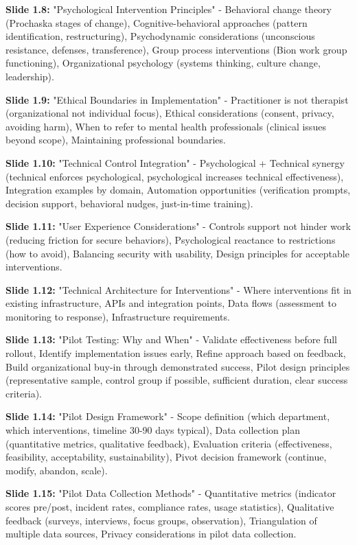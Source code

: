 \documentclass[11pt,a4paper]{article}
\begin{document}
\textbf{Slide 1.8:} "Psychological Intervention Principles" - Behavioral change theory (Prochaska stages of change), Cognitive-behavioral approaches (pattern identification, restructuring), Psychodynamic considerations (unconscious resistance, defenses, transference), Group process interventions (Bion work group functioning), Organizational psychology (systems thinking, culture change, leadership).

\textbf{Slide 1.9:} "Ethical Boundaries in Implementation" - Practitioner is not therapist (organizational not individual focus), Ethical considerations (consent, privacy, avoiding harm), When to refer to mental health professionals (clinical issues beyond scope), Maintaining professional boundaries.

\textbf{Slide 1.10:} "Technical Control Integration" - Psychological + Technical synergy (technical enforces psychological, psychological increases technical effectiveness), Integration examples by domain, Automation opportunities (verification prompts, decision support, behavioral nudges, just-in-time training).

\textbf{Slide 1.11:} "User Experience Considerations" - Controls support not hinder work (reducing friction for secure behaviors), Psychological reactance to restrictions (how to avoid), Balancing security with usability, Design principles for acceptable interventions.

\textbf{Slide 1.12:} "Technical Architecture for Interventions" - Where interventions fit in existing infrastructure, APIs and integration points, Data flows (assessment to monitoring to response), Infrastructure requirements.

\textbf{Slide 1.13:} "Pilot Testing: Why and When" - Validate effectiveness before full rollout, Identify implementation issues early, Refine approach based on feedback, Build organizational buy-in through demonstrated success, Pilot design principles (representative sample, control group if possible, sufficient duration, clear success criteria).

\textbf{Slide 1.14:} "Pilot Design Framework" - Scope definition (which department, which interventions, timeline 30-90 days typical), Data collection plan (quantitative metrics, qualitative feedback), Evaluation criteria (effectiveness, feasibility, acceptability, sustainability), Pivot decision framework (continue, modify, abandon, scale).

\textbf{Slide 1.15:} "Pilot Data Collection Methods" - Quantitative metrics (indicator scores pre/post, incident rates, compliance rates, usage statistics), Qualitative feedback (surveys, interviews, focus groups, observation), Triangulation of multiple data sources, Privacy considerations in pilot data collection.
\end{document}

